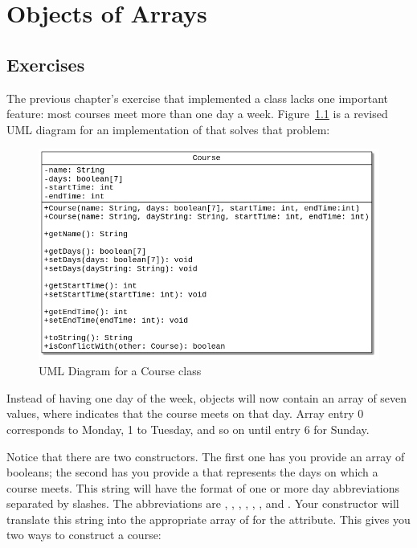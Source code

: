 \chapter{Objects of Arrays}

\section{Exercises}

\begin{exercise}
The previous chapter's exercise that implemented a  class lacks one important feature: most courses meet more than one day a week. Figure~\ref{fig.course2uml} is a revised UML diagram for an implementation of  that solves that problem:

\begin{figure}[!h]
\begin{center}
\includegraphics[scale=0.5]{figs/ch13/course.png}
\caption{UML Diagram for a Course class}
\label{fig.course2uml}
\end{center}
\end{figure}

Instead of having one day of the week,  objects will now contain an array of seven  values, where  indicates that the course meets on that day. Array entry 0 corresponds to Monday, 1 to Tuesday, and so on until entry 6 for Sunday.

Notice that there are two constructors. The first one has you provide an array of booleans; the second has you provide a  that represents the days on which a course meets. This string will have the format of one or more day abbreviations separated by slashes.  The abbreviations are , , , , , , and  .  Your constructor will translate this string into the appropriate array of  for the  attribute. This gives you two ways to construct a course:


\end{exercise}

